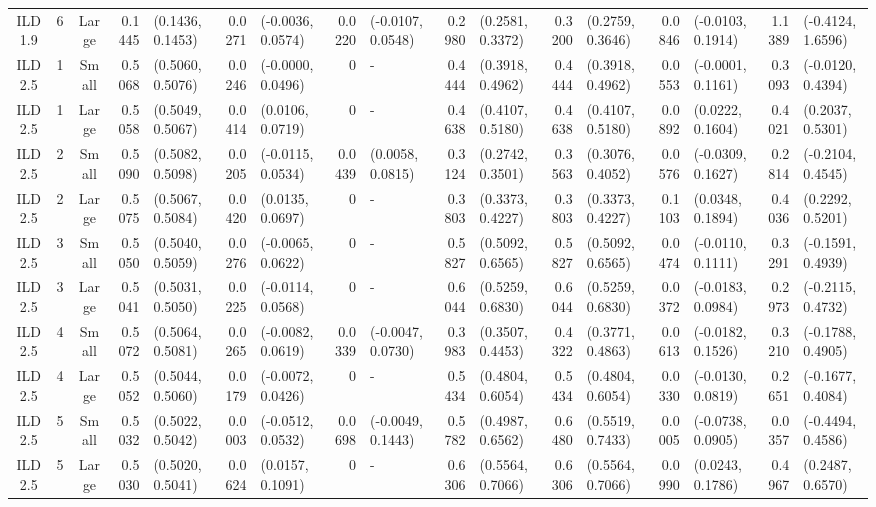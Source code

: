 \begin{landscape}
\begin{table}
\begin{tabular}{cccrlrlrlrlrlrlrl}
ILD1.9	&	6	&	Large	&	0.1445	&	(0.1436, 0.1453)	&	0.0271	&	(-0.0036, 0.0574)	&	0.0220	&	(-0.0107, 0.0548)	&	0.2980	&	(0.2581, 0.3372)	&	0.3200	&	(0.2759, 0.3646)	&	0.0846	&	(-0.0103, 0.1914)	&	1.1389	&	(-0.4124, 1.6596)	\\
ILD2.5	&	1	&	Small	&	0.5068	&	(0.5060, 0.5076)	&	0.0246	&	(-0.0000, 0.0496)	&	0	&	-	&	0.4444	&	(0.3918, 0.4962)	&	0.4444	&	(0.3918, 0.4962)	&	0.0553	&	(-0.0001, 0.1161)	&	0.3093	&	(-0.0120, 0.4394)	\\
ILD2.5	&	1	&	Large	&	0.5058	&	(0.5049, 0.5067)	&	0.0414	&	(0.0106, 0.0719)	&	0	&	-	&	0.4638	&	(0.4107, 0.5180)	&	0.4638	&	(0.4107, 0.5180)	&	0.0892	&	(0.0222, 0.1604)	&	0.4021	&	(0.2037, 0.5301)	\\
ILD2.5	&	2	&	Small	&	0.5090	&	(0.5082, 0.5098)	&	0.0205	&	(-0.0115, 0.0534)	&	0.0439	&	(0.0058, 0.0815)	&	0.3124	&	(0.2742, 0.3501)	&	0.3563	&	(0.3076, 0.4052)	&	0.0576	&	(-0.0309, 0.1627)	&	0.2814	&	(-0.2104, 0.4545)	\\
ILD2.5	&	2	&	Large	&	0.5075	&	(0.5067, 0.5084)	&	0.0420	&	(0.0135, 0.0697)	&	0	&	-	&	0.3803	&	(0.3373, 0.4227)	&	0.3803	&	(0.3373, 0.4227)	&	0.1103	&	(0.0348, 0.1894)	&	0.4036	&	(0.2292, 0.5201)	\\
ILD2.5	&	3	&	Small	&	0.5050	&	(0.5040, 0.5059)	&	0.0276	&	(-0.0065, 0.0622)	&	0	&	-	&	0.5827	&	(0.5092, 0.6565)	&	0.5827	&	(0.5092, 0.6565)	&	0.0474	&	(-0.0110, 0.1111)	&	0.3291	&	(-0.1591, 0.4939)	\\
ILD2.5	&	3	&	Large	&	0.5041	&	(0.5031, 0.5050)	&	0.0225	&	(-0.0114, 0.0568)	&	0	&	-	&	0.6044	&	(0.5259, 0.6830)	&	0.6044	&	(0.5259, 0.6830)	&	0.0372	&	(-0.0183, 0.0984)	&	0.2973	&	(-0.2115, 0.4732)	\\
ILD2.5	&	4	&	Small	&	0.5072	&	(0.5064, 0.5081)	&	0.0265	&	(-0.0082, 0.0619)	&	0.0339	&	(-0.0047, 0.0730)	&	0.3983	&	(0.3507, 0.4453)	&	0.4322	&	(0.3771, 0.4863)	&	0.0613	&	(-0.0182, 0.1526)	&	0.3210	&	(-0.1788, 0.4905)	\\
ILD2.5	&	4	&	Large	&	0.5052	&	(0.5044, 0.5060)	&	0.0179	&	(-0.0072, 0.0426)	&	0	&	-	&	0.5434	&	(0.4804, 0.6054)	&	0.5434	&	(0.4804, 0.6054)	&	0.0330	&	(-0.0130, 0.0819)	&	0.2651	&	(-0.1677, 0.4084)	\\
ILD2.5	&	5	&	Small	&	0.5032	&	(0.5022, 0.5042)	&	0.0003	&	(-0.0512, 0.0532)	&	0.0698	&	(-0.0049, 0.1443)	&	0.5782	&	(0.4987, 0.6562)	&	0.6480	&	(0.5519, 0.7433)	&	0.0005	&	(-0.0738, 0.0905)	&	0.0357	&	(-0.4494, 0.4586)	\\
ILD2.5	&	5	&	Large	&	0.5030	&	(0.5020, 0.5041)	&	0.0624	&	(0.0157, 0.1091)	&	0	&	-	&	0.6306	&	(0.5564, 0.7066)	&	0.6306	&	(0.5564, 0.7066)	&	0.0990	&	(0.0243, 0.1786)	&	0.4967	&	(0.2487, 0.6570)	\\

\end{tabular}
\end{table}
\end{landscape}
